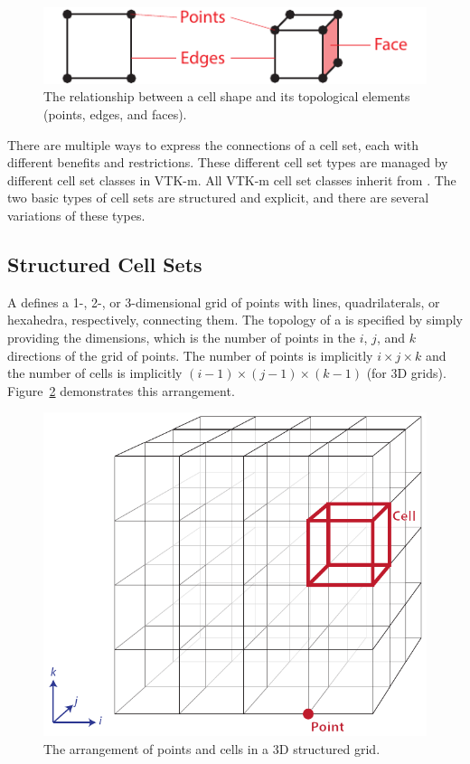 \begin{figure}[htb]
  \centering
  \includegraphics{images/CellConstituents}
  \caption{The relationship between a cell shape and its topological
    elements (points, edges, and faces).}
  \label{fig:CellTopology}
\end{figure}

There are multiple ways to express the connections of a cell set, each with
different benefits and restrictions. These different cell set types are
managed by different cell set classes in VTK-m. All VTK-m cell set classes
inherit from . The two basic types of cell sets are
structured and explicit, and there are several variations of these types.

\subsection{Structured Cell Sets}


A  defines a 1-, 2-, or 3-dimensional grid of
points with lines, quadrilaterals, or hexahedra, respectively, connecting
them. The topology of a  is specified by
simply providing the dimensions, which is the number of points in the $i$,
$j$, and $k$ directions of the grid of points. The number of points is
implicitly $i \times j \times k$ and the number of cells is implicitly
$(i-1) \times (j-1) \times (k-1)$ (for 3D grids).
Figure~\ref{fig:CellSetStructured} demonstrates this arrangement.

\begin{figure}[htb]
  \centering
  \includegraphics{images/StructuredCellSet}
  \caption{The arrangement of points and cells in a 3D structured grid.}
  \label{fig:CellSetStructured}
\end{figure}

